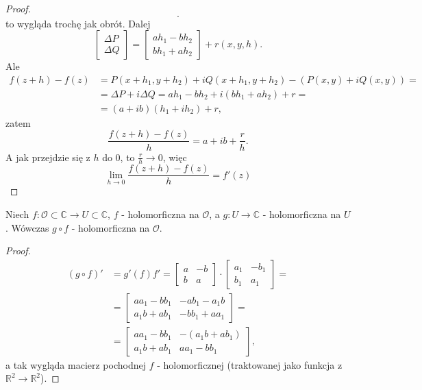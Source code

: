 \documentclass[../main.tex]{subfiles}
\begin{document}
\begin{proof}
\[        .\]
     to wygląda trochę jak obrót. Dalej
        \[
            \begin{bmatrix} \Delta P\\ \Delta Q \end{bmatrix} = \begin{bmatrix} a h_1 - b h_2\\ b h_1 + a h_2 \end{bmatrix} + r(x,y,h)
        .\]
    Ale
    \begin{align*}
        f(z+h) - f(z) &= P(x+h_1, y+h_2) + i Q(x+h_1, y+h_2) - \left( P(x,y) + i Q(x,y) \right) =\\
        &= \Delta P + i \Delta Q = a h_1 - bh_2 + i \left( bh_1 + ah_2 \right) + r = \\
        &= \left( a + ib \right) \left( h_1 + ih_2 \right) + r
    ,\end{align*}
    zatem
        \[
            \frac{f(z+h) - f(z)}{h} = a + ib + \frac{r}{h}
        .\]
    A jak przejdzie się z $h$ do $0$, to $\frac{r}{h} \to 0$, więc
        \[
            \lim\limits_{h \to 0} \frac{f(z+h) - f(z)}{h} = f'(z)
        \]
    \end{proof}
    \begin{stw}
        Niech $f: \mathcal{O}\subset\mathbb{C}\to U\subset\mathbb{C}$, $f$ - holomorficzna na $\mathcal{O}$, a $g: U \to \mathbb{C}$ - holomorficzna na $U$. Wówczas $g\circ f$ - holomorficzna na $\mathcal{O}$.
    \end{stw}
    \begin{proof}
        \begin{align*}
            \left( g\circ f \right) ' &= g'(f) f' = \begin{bmatrix} a& -b\\ b&a \end{bmatrix} \cdot \begin{bmatrix} a_1& -b_1\\ b_1& a_1 \end{bmatrix} =\\
                &= \begin{bmatrix} a a_1 - b b_1 & -ab_1 -a_1b\\ a_1b + ab_1 & -bb_1 + aa_1\end{bmatrix} =\\
                    &= \begin{bmatrix} aa_1 - bb_1& -\left( a_1b + ab_1 \right) \\ a_1b + ab_1 & aa_1 - bb_1 \end{bmatrix}
        ,\end{align*}
    a tak wygląda macierz pochodnej $f$ - holomorficznej (traktowanej jako funkcja z $\mathbb{R}^2\to \mathbb{R}^2$).
    \end{proof}
\end{document}

